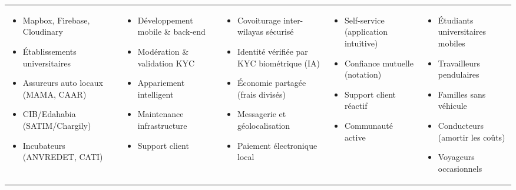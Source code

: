 \begin{table}[H]
\begin{tcolorbox}
\begin{tabularx}{\linewidth}{ >{\raggedright\arraybackslash}X | >{\raggedright\arraybackslash}X | >{\raggedright\arraybackslash}X | >{\raggedright\arraybackslash}X | >{\raggedright\arraybackslash}X }
\scriptsize
\begin{itemize}[leftmargin=0.8em, nosep]
  \item Mapbox, Firebase, Cloudinary
  \item Établissements universitaires
  \item Assureurs auto locaux (MAMA, CAAR)
  \item CIB/Edahabia (SATIM/Chargily)
  \item Incubateurs (ANVREDET, CATI)
\end{itemize} &
\scriptsize
\begin{itemize}[leftmargin=0.8em, nosep]
  \item Développement mobile \& back-end
  \item Modération \& validation KYC
  \item Appariement intelligent
  \item Maintenance infrastructure
  \item Support client
\end{itemize} &
\scriptsize
\begin{itemize}[leftmargin=0.8em, nosep]
  \item Covoiturage inter-wilayas sécurisé
  \item Identité vérifiée par KYC biométrique (IA)
  \item Économie partagée (frais divisés)
  \item Messagerie et géolocalisation
  \item Paiement électronique local
\end{itemize} &
\scriptsize
\begin{itemize}[leftmargin=0.8em, nosep]
  \item Self-service (application intuitive)
  \item Confiance mutuelle (notation)
  \item Support client réactif
  \item Communauté active
\end{itemize} &
\scriptsize
\begin{itemize}[leftmargin=0.8em, nosep]
  \item Étudiants universitaires mobiles
  \item Travailleurs pendulaires
  \item Familles sans véhicule
  \item Conducteurs (amortir les coûts)
  \item Voyageurs occasionnels
\end{itemize} \\[15pt]


\end{tabularx}
\end{tcolorbox}
\end{table}
